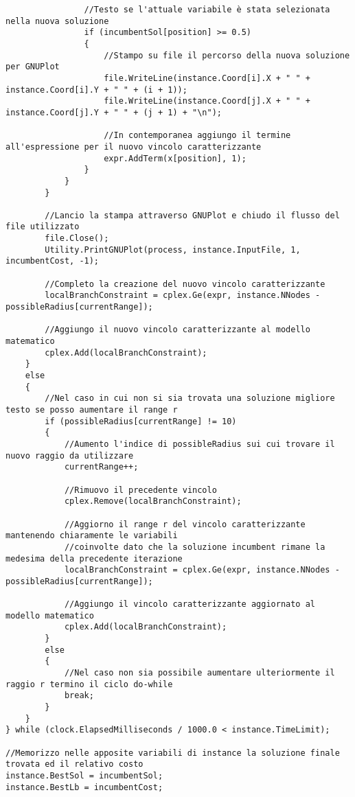 \documentclass[11pt]{article}
\begin{document}
\begin{lstlisting}
                //Testo se l'attuale variabile è stata selezionata nella nuova soluzione
                if (incumbentSol[position] >= 0.5)
                {
                    //Stampo su file il percorso della nuova soluzione per GNUPlot
                    file.WriteLine(instance.Coord[i].X + " " + instance.Coord[i].Y + " " + (i + 1));
                    file.WriteLine(instance.Coord[j].X + " " + instance.Coord[j].Y + " " + (j + 1) + "\n");

                    //In contemporanea aggiungo il termine all'espressione per il nuovo vincolo caratterizzante
                    expr.AddTerm(x[position], 1);
                }
            }
        }

        //Lancio la stampa attraverso GNUPlot e chiudo il flusso del file utilizzato
        file.Close();
        Utility.PrintGNUPlot(process, instance.InputFile, 1, incumbentCost, -1);

        //Completo la creazione del nuovo vincolo caratterizzante
        localBranchConstraint = cplex.Ge(expr, instance.NNodes - possibleRadius[currentRange]);

        //Aggiungo il nuovo vincolo caratterizzante al modello matematico
        cplex.Add(localBranchConstraint);
    }
    else
    {
        //Nel caso in cui non si sia trovata una soluzione migliore testo se posso aumentare il range r
        if (possibleRadius[currentRange] != 10)
        {
            //Aumento l'indice di possibleRadius sui cui trovare il nuovo raggio da utilizzare
            currentRange++;

            //Rimuovo il precedente vincolo
            cplex.Remove(localBranchConstraint);

            //Aggiorno il range r del vincolo caratterizzante mantenendo chiaramente le variabili
            //coinvolte dato che la soluzione incumbent rimane la medesima della precedente iterazione
            localBranchConstraint = cplex.Ge(expr, instance.NNodes - possibleRadius[currentRange]);

            //Aggiungo il vincolo caratterizzante aggiornato al modello matematico
            cplex.Add(localBranchConstraint);
        }
        else
        {
            //Nel caso non sia possibile aumentare ulteriormente il raggio r termino il ciclo do-while
            break;
        }
    }
} while (clock.ElapsedMilliseconds / 1000.0 < instance.TimeLimit);

//Memorizzo nelle apposite variabili di instance la soluzione finale trovata ed il relativo costo
instance.BestSol = incumbentSol;
instance.BestLb = incumbentCost;


\end{lstlisting}
\end{document}
